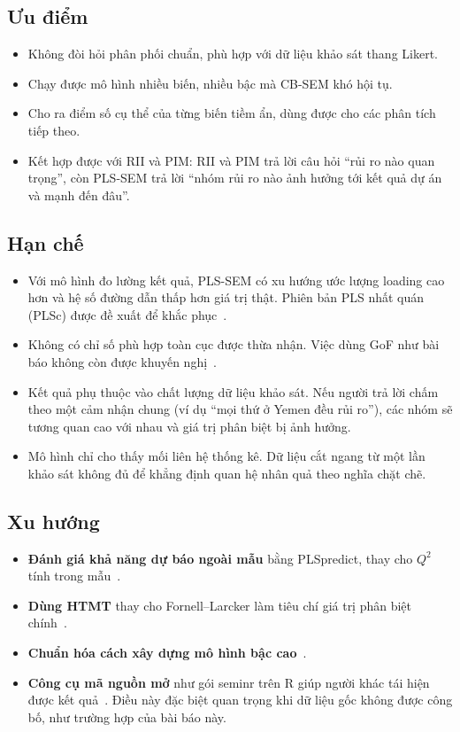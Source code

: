 \subsection{Ưu điểm}

\begin{itemize}
  \item Không đòi hỏi phân phối chuẩn, phù hợp với dữ liệu khảo sát thang Likert.
  \item Chạy được mô hình nhiều biến, nhiều bậc mà CB-SEM khó hội tụ.
  \item Cho ra điểm số cụ thể của từng biến tiềm ẩn, dùng được cho các phân tích tiếp theo.
  \item Kết hợp được với RII và PIM: RII và PIM trả lời câu hỏi ``rủi ro nào quan trọng'', còn PLS-SEM trả lời ``nhóm rủi ro nào ảnh hưởng tới kết quả dự án và mạnh đến đâu''.
\end{itemize}

\subsection{Hạn chế}

\begin{itemize}
  \item Với mô hình đo lường kết quả, PLS-SEM có xu hướng ước lượng loading cao hơn và hệ số đường dẫn thấp hơn giá trị thật. Phiên bản PLS nhất quán (PLSc) được đề xuất để khắc phục~\cite{dijkstra2015}.
  \item Không có chỉ số phù hợp toàn cục được thừa nhận. Việc dùng GoF như bài báo không còn được khuyến nghị~\cite{henseler2013}.
  \item Kết quả phụ thuộc vào chất lượng dữ liệu khảo sát. Nếu người trả lời chấm theo một cảm nhận chung (ví dụ ``mọi thứ ở Yemen đều rủi ro''), các nhóm sẽ tương quan cao với nhau và giá trị phân biệt bị ảnh hưởng.
  \item Mô hình chỉ cho thấy mối liên hệ thống kê. Dữ liệu cắt ngang từ một lần khảo sát không đủ để khẳng định quan hệ nhân quả theo nghĩa chặt chẽ.
\end{itemize}

\subsection{Xu hướng}

\begin{itemize}
  \item \textbf{Đánh giá khả năng dự báo ngoài mẫu} bằng PLSpredict, thay cho $Q^2$ tính trong mẫu~\cite{shmueli2019}.
  \item \textbf{Dùng HTMT} thay cho Fornell--Larcker làm tiêu chí giá trị phân biệt chính~\cite{henseler2015}.
  \item \textbf{Chuẩn hóa cách xây dựng mô hình bậc cao}~\cite{sarstedt2019hoc}.
  \item \textbf{Công cụ mã nguồn mở} như gói seminr trên R giúp người khác tái hiện được kết quả~\cite{hair2021workbook}. Điều này đặc biệt quan trọng khi dữ liệu gốc không được công bố, như trường hợp của bài báo này.
\end{itemize}
